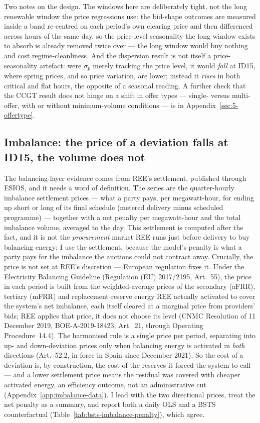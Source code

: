 \documentclass[11pt,a4paper]{article}
\theoremstyle{definition}
\theoremstyle{remark}
\theoremstyle{plain}
\begin{document}
Two notes on the design. The windows here are deliberately tight, not the long renewable window the price regressions use: the bid-shape outcomes are measured inside a band re-centred on each period's own clearing price and then differenced across hours of the same day, so the price-level seasonality the long window exists to absorb is already removed twice over --- the long window would buy nothing and cost regime-cleanliness. And the dispersion result is not itself a price-seasonality artefact: were $\sigma_p$ merely tracking the price level, it would \emph{fall} at ID15, where spring prices, and so price variation, are lower; instead it \emph{rises} in both critical and flat hours, the opposite of a seasonal reading. A further check that the CCGT result does not hinge on a shift in offer types --- single- versus multi-offer, with or without minimum-volume conditions --- is in Appendix~\ref{sec:5-offertype}.

\subsection{Imbalance: the price of a deviation falls at ID15, the volume does not}\label{sec:results:Q2}\label{sec:results:Q2-penalty}

The balancing-layer evidence comes from REE's settlement, published through ESIOS, and it needs a word of definition. The series are the quarter-hourly imbalance settlement prices --- what a party pays, per megawatt-hour, for ending up short or long of its final schedule (metered delivery minus scheduled programme) --- together with a net penalty per megawatt-hour and the total imbalance volume, averaged to the day. This settlement is computed after the fact, and it is not the \emph{procurement} market REE runs just before delivery to buy balancing energy; I use the settlement, because the model's penalty is what a party pays for the imbalance the auctions could not contract away. Crucially, the price is not set at REE's discretion --- European regulation fixes it. Under the Electricity Balancing Guideline (Regulation (EU) 2017/2195, Art.~55), the price in each period is built from the weighted-average prices of the secondary (aFRR), tertiary (mFRR) and replacement-reserve energy REE actually activated to cover the system's net imbalance, each itself cleared at a marginal price from providers' bids; REE applies that price, it does not choose its level (CNMC Resolution of 11 December 2019, BOE-A-2019-18423, Art.~21, through Operating Procedure~14.4). The harmonised rule is a single price per period, separating into up- and down-deviation prices only when balancing energy is activated in \emph{both} directions (Art.~52.2, in force in Spain since December 2021). So the cost of a deviation is, by construction, the cost of the reserves it forced the system to call --- and a lower settlement price means the residual was covered with cheaper activated energy, an efficiency outcome, not an administrative cut (Appendix~\ref{app:imbalance-data}). I lead with the two directional prices, treat the net penalty as a summary, and report both a daily OLS and a BSTS counterfactual (Table~\ref{tab:bsts-imbalance-penalty}), which agree.
\end{document}
